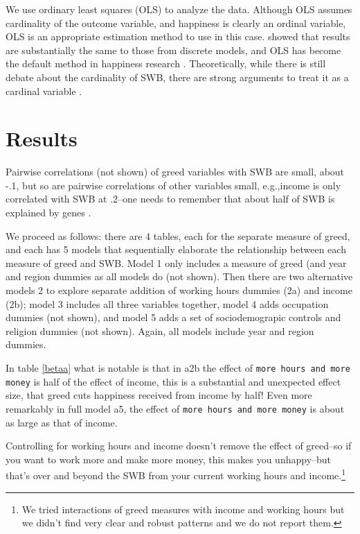 \documentclass[10pt, letterpaper]{article}
\begin{document}
\begin{spacing}{1.8}
We use ordinary least squares (OLS) to analyze the data. Although OLS assumes cardinality of the
outcome variable, and happiness is clearly an ordinal variable, 
OLS is an appropriate estimation method to use in this case. 
\citet{carbonell04} showed that results are substantially the same to those from discrete models, 
and  OLS has become the default method in happiness research \citep{blanchflower11}.
 Theoretically, while there is still debate about the cardinality of SWB, 
there are strong arguments to treat it as a cardinal variable \citep{ng96,ng97,ng11}. 


\section{Results}

Pairwise correlations (not shown) of greed variables with SWB are small, about
-.1, but so are pairwise correlations of other variables small, e.g.,income is
only correlated with SWB at  .2--one needs to remember that about half of SWB is explained by genes \citep{lykken96}.

We proceed as follows: there are 4 tables, each for the separate measure of
greed, and each has 5 models that sequentially elaborate the relationship
between each measure of greed and SWB. Model 1 only includes a measure of greed
(and year and region dummies as all models do (not shown). Then there are two
alternative models 2 to explore separate addition of working hours dummies (2a)
and income (2b); model 3 includes all three variables together, model 4 adds
occupation dummies (not shown), and model 5 adds a set of sociodemograpic
controls and religion dummies (not shown). 
Again, all models include year and region dummies.
 
In table \ref{betaa}  what is notable is that in a2b the effect of \texttt{more hours and more money} is half of the effect of income, this is a substantial and unexpected effect size, that greed cuts happiness received from income by half! Even more remarkably in full model a5, the effect of \texttt{more hours and more money} is about as large as that of income.

Controlling for working hours and income doesn't remove the effect of greed--so
if you want to work more and make more money, this  makes you unhappy--but
that's over and beyond the SWB from your current working hours and
income.\footnote{We tried interactions of greed measures with income and working
hours but we didn't find very clear and robust patterns and we do not report them.}
 

\end{spacing}
\end{document}
